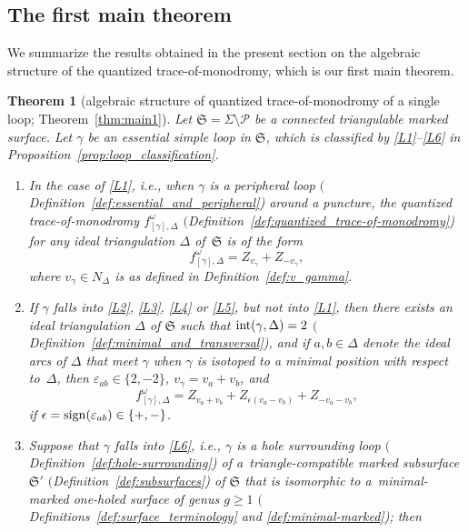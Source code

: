 \documentclass[pdftex]{sigma}
\numberwithin{equation}{section}
\newtheorem{Theorem}{Theorem}[section]
\theoremstyle{definition}
\begin{document}
\subsection{The first main theorem}
We summarize the results obtained in the present section on the algebraic structure of the quantized trace-of-monodromy, which is our first main theorem.
\begin{Theorem}[algebraic structure of quantized trace-of-monodromy of a single loop; Theorem~\ref{thm:main1}]
\label{thm:AS}
Let $\mathfrak{S} = \Sigma\setminus\mathcal{P}$ be a connected triangulable marked surface. Let $\gamma$ be an essential simple loop in $\mathfrak{S}$, which is classified by \ref{L1}--\ref{L6} in Proposition~{\rm \ref{prop:loop_classification}}.
\begin{enumerate}[label={\rm (AS\arabic*)}]\itemsep=0pt\setlength{\leftskip}{0.22cm}
\item\label{AS1} In the case of \ref{L1}, i.e., when $\gamma$ is a peripheral loop $($Definition~{\rm \ref{def:essential_and_peripheral})} around a puncture, the quantized trace-of-monodromy $f^\omega_{[\gamma],\Delta}$ $($Definition~{\rm \ref{def:quantized_trace-of-monodromy})} for any ideal triangulation $\Delta$ of~$\mathfrak{S}$ is of the form
\[
f^\omega_{[\gamma],\Delta} = Z_{v_\gamma} + Z_{-v_\gamma},
\]
where $v_\gamma \in N_\Delta$ is as defined in Definition~{\rm \ref{def:v_gamma}}.
\item\label{AS2} If $\gamma$ falls into \ref{L2}, \ref{L3}, \ref{L4} or \ref{L5}, but not into \ref{L1}, then there exists an ideal triangulation $\Delta$ of $\mathfrak{S}$ such that ${\rm int}(\gamma,\Delta)=2$ $($Definition~{\rm \ref{def:minimal_and_transversal})}, and if $a,b \in \Delta$ denote the ideal arcs of $\Delta$ that meet $\gamma$ when $\gamma$ is isotoped to a minimal position with respect to~$\Delta$, then $\varepsilon_{ab} \in \{2,-2\}$, $v_\gamma = v_a + v_b$, and
\[
f^\omega_{[\gamma],\Delta} = Z_{v_a+v_b} + Z_{\epsilon(v_a - v_b)} + Z_{-v_a-v_b},
\]
if $\epsilon = {\rm sign}(\varepsilon_{ab}) \in \{+,-\}$.
\item\label{AS3} Suppose that $\gamma$ falls into \ref{L6}, i.e., $\gamma$ is a hole surrounding loop $($Definition~{\rm \ref{def:hole-surrounding})} of a~triangle-compatible marked subsurface $\mathfrak{S}'$ $($Definition~{\rm \ref{def:subsurfaces})} of $\mathfrak{S}$ that is isomorphic to a~minimal-marked one-holed surface of genus $g\ge 1$ $($Definitions~{\rm \ref{def:surface_terminology}} and {\rm \ref{def:minimal-marked})}; then
\begin{enumerate}[label={\rm (\alph*)}]\itemsep=0pt

\end{enumerate}
\end{enumerate}
\end{Theorem}
\end{document}
